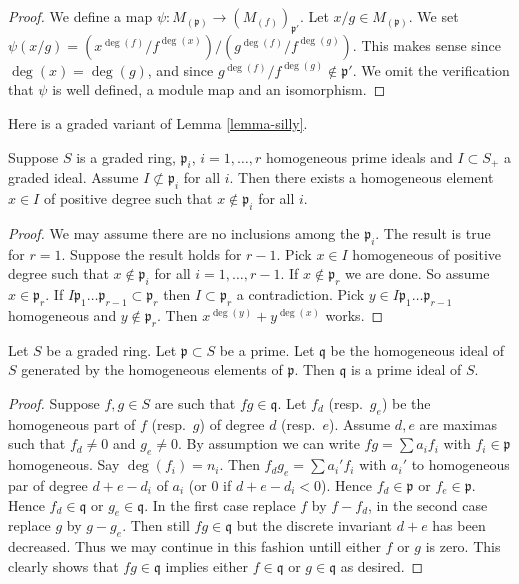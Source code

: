 \begin{proof}
We define a map $\psi : M_{(\mathfrak p)} \to (M_{(f)})_{\mathfrak p'}$.
Let $x/g \in M_{(\mathfrak p)}$. We set
$\psi(x/g) = (x^{\deg(f)}/f^{\deg(x)})/(g^{\deg(f)}/f^{\deg(g)})$.
This makes sense since $\deg(x) = \deg(g)$, and since
$g^{\deg(f)}/f^{\deg(g)} \not \in \mathfrak p'$.
We omit the verification that $\psi$ is well defined, a module map
and an isomorphism.
\end{proof}

\noindent
Here is a graded variant of Lemma \ref{lemma-silly}.

\begin{lemma}
\label{lemma-graded-silly}
Suppose $S$ is a graded ring, $\mathfrak p_i$, $i = 1, \ldots, r$
homogeneous prime ideals and $I \subset S_{+}$ a graded ideal.
Assume $I \not\subset \mathfrak p_i$ for all $i$. Then there
exists a homogeneous element $x\in I$ of positive degree such
that $x\not\in \mathfrak p_i$ for all $i$.
\end{lemma}

\begin{proof}
We may assume there are no inclusions among the $\mathfrak p_i$.
The result is true for $r = 1$. Suppose the result holds for $r - 1$.
Pick $x \in I$ homogeneous of positive degree such that
$x \not \in \mathfrak p_i$ for all $i = 1, \ldots, r - 1$.
If $x \not\in \mathfrak p_r$ we are done. So assume $x \in \mathfrak p_r$.
If $I \mathfrak p_1 \ldots \mathfrak p_{r-1} \subset \mathfrak p_r$
then $I \subset \mathfrak p_r$ a contradiction.
Pick $y \in I\mathfrak p_1 \ldots \mathfrak p_{r-1}$ homogeneous
and $y \not \in \mathfrak p_r$. Then $x^{\deg(y)} + y^{\deg(x)}$ works.
\end{proof}

\begin{lemma}
\label{lemma-smear-out}
Let $S$ be a graded ring.
Let $\mathfrak p \subset S$ be a prime.
Let $\mathfrak q$ be the homogeneous ideal of $S$ generated by the
homogeneous elements of $\mathfrak p$. Then $\mathfrak q$ is a
prime ideal of $S$.
\end{lemma}

\begin{proof}
Suppose $f, g \in S$ are such that $fg \in \mathfrak q$.
Let $f_d$ (resp.\ $g_e$) be the homogeneous part of
$f$ (resp.\ $g$) of degree $d$ (resp.\ $e$). Assume $d, e$ are
maximas such that $f_d \not = 0$ and $g_e \not = 0$.
By assumption we can write $fg = \sum a_i f_i$ with
$f_i \in \mathfrak p$ homogeneous. Say $\deg(f_i) = n_i$.
Then $f_d g_e = \sum a_i' f_i$ with $a_i'$ to homogeneous
par of degree $d + e - d_i$ of $a_i$ (or $0$ if $d + e -d_i < 0$).
Hence $f_d \in \mathfrak p$ or $f_e \in \mathfrak p$. Hence
$f_d \in \mathfrak q$ or $g_e \in \mathfrak q$. In the first
case replace $f$ by $f - f_d$, in the second case replace
$g$ by $g - g_e$. Then still $fg \in \mathfrak q$ but the discrete
invariant $d + e$ has been decreased. Thus we may continue in this
fashion untill either $f$ or $g$ is zero. This clearly shows that
$fg \in \mathfrak q$ implies either $f \in \mathfrak q$ or $g \in \mathfrak q$
as desired.
\end{proof}

